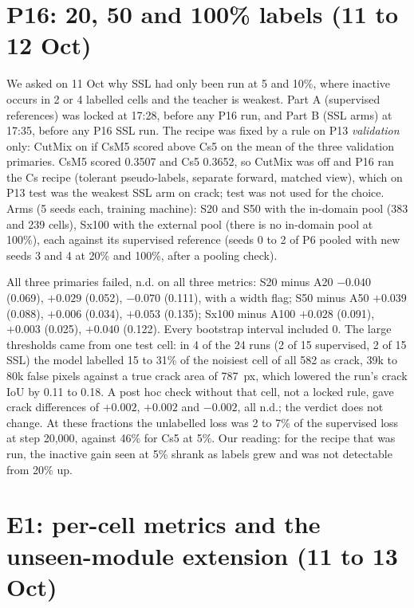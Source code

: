 \section{P16: 20, 50 and 100\% labels (11 to 12 Oct)}\label{sec:pseries-p16}

We asked on 11 Oct why SSL had only been run at 5 and 10\%, where inactive occurs in 2 or 4 labelled cells and the teacher is
weakest. Part A (supervised references) was locked at 17:28, before any P16 run, and Part B (SSL arms) at 17:35, before any P16
SSL run. The recipe was fixed
by a rule on P13 \emph{validation} only: CutMix on if CsM5 scored above Cs5 on the mean of the three validation primaries. CsM5 scored
0.3507 and Cs5 0.3652, so CutMix was off and P16 ran the Cs recipe (tolerant pseudo-labels, separate forward, matched view), which on
P13 test was the weakest SSL arm on crack; test was not used for the choice. Arms (5 seeds each, training machine): S20 and S50 with
the in-domain pool (383 and 239 cells), Sx100 with the external pool (there is no in-domain pool at 100\%), each against its supervised
reference (seeds 0 to 2 of P6 pooled with new seeds 3 and 4 at 20\% and 100\%, after a pooling check).

All three primaries failed, n.d. on all three metrics: S20 minus A20 $-0.040$ (0.069), $+0.029$ (0.052), $-0.070$ (0.111), with a
width flag; S50 minus A50 $+0.039$ (0.088), $+0.006$ (0.034), $+0.053$ (0.135); Sx100 minus A100 $+0.028$ (0.091), $+0.003$ (0.025),
$+0.040$ (0.122). Every bootstrap interval included 0. The large thresholds came from one test cell: in 4 of the 24 runs (2 of 15
supervised, 2 of 15 SSL) the model labelled 15 to 31\% of the noisiest cell of all 582 as crack, 39k to 80k false pixels against a
true crack area of 787~px, which lowered the run's crack IoU by 0.11 to 0.18. A post hoc check without that cell, not a locked rule,
gave crack differences of $+0.002$, $+0.002$ and $-0.002$, all n.d.; the verdict does not change. At these fractions the unlabelled
loss was 2 to 7\% of the supervised loss at step 20,000, against 46\% for Cs5 at 5\%. Our reading: for the recipe that was run, the
inactive gain seen at 5\% shrank as labels grew and was not detectable from 20\% up.

\section{E1: per-cell metrics and the unseen-module extension (11 to 13 Oct)}\label{sec:pseries-e1}

